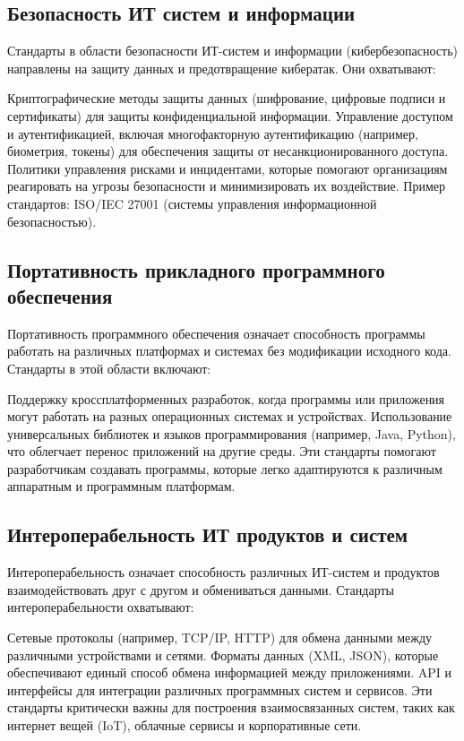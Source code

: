 \subsection{Безопасность ИТ систем и информации}
Стандарты в области безопасности ИТ-систем и информации (кибербезопасность) направлены на защиту данных и предотвращение кибератак. Они охватывают:

Криптографические методы защиты данных (шифрование, цифровые подписи и сертификаты) для защиты конфиденциальной информации.
Управление доступом и аутентификацией, включая многофакторную аутентификацию (например, биометрия, токены) для обеспечения защиты от несанкционированного доступа.
Политики управления рисками и инцидентами, которые помогают организациям реагировать на угрозы безопасности и минимизировать их воздействие.
Пример стандартов: ISO/IEC 27001 (системы управления информационной безопасностью).

\subsection{Портативность прикладного программного обеспечения}
Портативность программного обеспечения означает способность программы работать на различных платформах и системах без модификации исходного кода. Стандарты в этой области включают:

Поддержку кроссплатформенных разработок, когда программы или приложения могут работать на разных операционных системах и устройствах.
Использование универсальных библиотек и языков программирования (например, Java, Python), что облегчает перенос приложений на другие среды.
Эти стандарты помогают разработчикам создавать программы, которые легко адаптируются к различным аппаратным и программным платформам.

\subsection{Интероперабельность ИТ продуктов и систем}
Интероперабельность означает способность различных ИТ-систем и продуктов взаимодействовать друг с другом и обмениваться данными. Стандарты интероперабельности охватывают:

Сетевые протоколы (например, TCP/IP, HTTP) для обмена данными между различными устройствами и сетями.
Форматы данных (XML, JSON), которые обеспечивают единый способ обмена информацией между приложениями.
API и интерфейсы для интеграции различных программных систем и сервисов.
Эти стандарты критически важны для построения взаимосвязанных систем, таких как интернет вещей (IoT), облачные сервисы и корпоративные сети.

